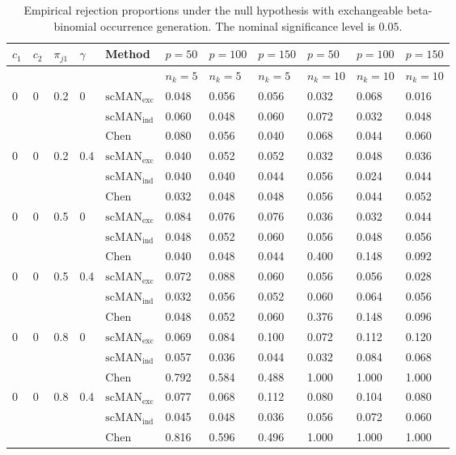 \begin{table}[H]
\scriptsize
\centering
\caption{Empirical rejection proportions under the null hypothesis with exchangeable beta-binomial occurrence generation. The nominal significance level is $0.05$.}
\label{tab:size-exchangeable}
\begin{tabular}{lllllllllll}
\hline
$c_1$ & $c_2$ & $\pi_{j1}$ & $\gamma$ & Method & $p=50$ & $p=100$ & $p=150$ & $p=50$ & $p=100$ & $p=150$ \\
\hline
& & & & & $n_k=5$ & $n_k=5$ & $n_k=5$ & $n_k=10$ & $n_k=10$ & $n_k=10$ \\
0 & 0 & 0.2 & 0 & $\mathrm{scMAN}_{\mathrm{exc}}$ & 0.048 & 0.056 & 0.056 & 0.032 & 0.068 & 0.016 \\
 &  &  &  & $\mathrm{scMAN}_{\mathrm{ind}}$ & 0.060 & 0.048 & 0.060 & 0.072 & 0.032 & 0.048 \\
 &  &  &  & Chen & 0.080 & 0.056 & 0.040 & 0.068 & 0.044 & 0.060 \\
0 & 0 & 0.2 & 0.4 & $\mathrm{scMAN}_{\mathrm{exc}}$ & 0.040 & 0.052 & 0.052 & 0.032 & 0.048 & 0.036 \\
 &  &  &  & $\mathrm{scMAN}_{\mathrm{ind}}$ & 0.040 & 0.040 & 0.044 & 0.056 & 0.024 & 0.044 \\
 &  &  &  & Chen & 0.032 & 0.048 & 0.048 & 0.056 & 0.044 & 0.052 \\
0 & 0 & 0.5 & 0 & $\mathrm{scMAN}_{\mathrm{exc}}$ & 0.084 & 0.076 & 0.076 & 0.036 & 0.032 & 0.044 \\
 &  &  &  & $\mathrm{scMAN}_{\mathrm{ind}}$ & 0.048 & 0.052 & 0.060 & 0.056 & 0.048 & 0.056 \\
 &  &  &  & Chen & 0.040 & 0.048 & 0.044 & 0.400 & 0.148 & 0.092 \\
0 & 0 & 0.5 & 0.4 & $\mathrm{scMAN}_{\mathrm{exc}}$ & 0.072 & 0.088 & 0.060 & 0.056 & 0.056 & 0.028 \\
 &  &  &  & $\mathrm{scMAN}_{\mathrm{ind}}$ & 0.032 & 0.056 & 0.052 & 0.060 & 0.064 & 0.056 \\
 &  &  &  & Chen & 0.048 & 0.052 & 0.060 & 0.376 & 0.148 & 0.096 \\
0 & 0 & 0.8 & 0 & $\mathrm{scMAN}_{\mathrm{exc}}$ & 0.069 & 0.084 & 0.100 & 0.072 & 0.112 & 0.120 \\
 &  &  &  & $\mathrm{scMAN}_{\mathrm{ind}}$ & 0.057 & 0.036 & 0.044 & 0.032 & 0.084 & 0.068 \\
 &  &  &  & Chen & 0.792 & 0.584 & 0.488 & 1.000 & 1.000 & 1.000 \\
0 & 0 & 0.8 & 0.4 & $\mathrm{scMAN}_{\mathrm{exc}}$ & 0.077 & 0.068 & 0.112 & 0.080 & 0.104 & 0.080 \\
 &  &  &  & $\mathrm{scMAN}_{\mathrm{ind}}$ & 0.045 & 0.048 & 0.036 & 0.056 & 0.072 & 0.060 \\
 &  &  &  & Chen & 0.816 & 0.596 & 0.496 & 1.000 & 1.000 & 1.000 \\
\hline
\end{tabular}
\end{table}
